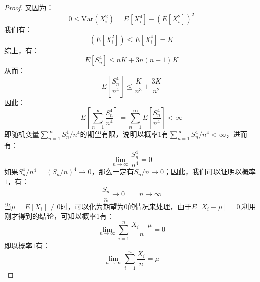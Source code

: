 \documentclass[10pt,a4paper,UTF8]{article}
\begin{document}
\begin{proof}
又因为：
\begin{equation}
\label{eq:8}
0 \leq \mathrm{Var}(X_{i}^{2}) = E[X_{i}^{4}] - (E[X_{i}^{2}])^{2}
\end{equation}
我们有：
\begin{equation}
\label{eq:9}
(E[X_{i}^{2}]) \leq E[X_{i}^{4}] = K
\end{equation}
综上，有：
\begin{equation}
\label{eq:10}
E[S_{n}^{4}] \leq nK + 3n(n-1)K
\end{equation}
从而：
\begin{equation}
\label{eq:11}
E[\frac{S_{n}^{4}}{n^{4}}] \leq \frac{K}{n^{3}} + \frac{3K}{n^{2}}
\end{equation}
因此：
\begin{equation}
\label{eq:12}
E[\sum_{n=1}^{\infty}\frac{S_{n}^{4}}{n^{4}}] = \sum_{n=1}^{\infty}E[\frac{S_{n}^{4}}{n^{4}}] < \infty
\end{equation}
即随机变量\(\sum_{n=1}^{\infty}S_{n}^{4}/n^{4}\)的期望有限，说明以概率\(1\)有\(\sum_{n=1}^{\infty}S_{n}^{4}/n^{4} < \infty\)，进而有：
\begin{equation}
\label{eq:13}
\lim_{n\to \infty}\frac{S_{n}^{4}}{n^{4}} = 0
\end{equation}
如果\(S_{n}^{4}/n^{4} = (S_{n}/n)^{4} \to 0\)，那么一定有\(S_{n}/n \to 0\)；因此，我们可以证明以概率\(1\)，有：
\begin{equation}
\label{eq:14}
\frac{S_{n}}{n}\to 0 \qquad n\to \infty
\end{equation}
当\(\mu = E[X_{i}]\neq 0\)时，可以化为期望为\(0\)的情况来处理，由于\(E[X_{i} - \mu] = 0\),利用刚才得到的结论，可知以概率1有：
\begin{equation}
\label{eq:15}
\lim_{n\to \infty}\sum_{i=1}^{n}\frac{X_{i} - \mu}{n} = 0
\end{equation}
即以概率\(1\)有：
\begin{equation}
\label{eq:16}
\lim_{n\to\infty}\sum_{i=1}^{n}\frac{X_{i}}{n} = \mu
\end{equation}
\end{proof}
\end{document}
